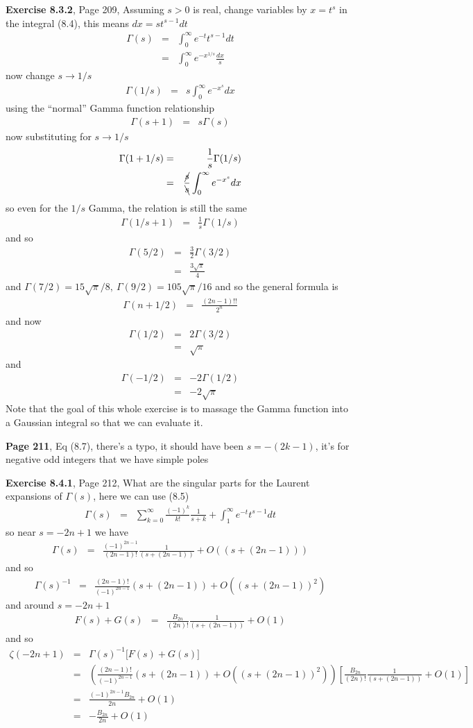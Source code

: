 \documentclass[aps,preprint,preprintnumbers,nofootinbib,showpacs,prd]{revtex4-1}
\newcommand{\nbea}{\begin{eqnarray*}}
\newcommand{\neea}{\end{eqnarray*}}
\begin{document}
{\bf Exercise 8.3.2}, Page 209, Assuming $s>0$ is real, change variables by $x=t^s$ in the integral (8.4), this means $dx=st^{s-1}dt$
%
\nbea
\Gamma(s) & = & \int_0^\infty e^{-t}t^{s-1}dt \\
& = & \int_0^\infty e^{-x^{1/s}} \frac{dx}{s}
\neea
%
now change $s\to 1/s$
%
\nbea
\Gamma(1/s) & = & s \int_0^\infty e^{-x^s} dx
\neea
%
using the ``normal'' Gamma function relationship
%
\nbea
\Gamma(s+1) & = & s\Gamma(s)
\neea
%
now substituting for $s\to1/s$
%
\nbea
\Gamma(1+1/s) & = & \frac{1}{s}\Gamma(1/s) \\
& = & \frac{\cancel{s}}{\bcancel{s}} \int_0^\infty e^{-x^s} dx
\neea
%
so even for the $1/s$ Gamma, the relation is still the same
%
\nbea
\Gamma(1/s+1) & = & \frac{1}{s}\Gamma(1/s)
\neea
%
and so
%
\nbea
\Gamma(5/2) & = & \frac{3}{2} \Gamma(3/2) \\
& = & \frac{3\sqrt{\pi}}{4}
\neea
%
and $\Gamma(7/2) = 15\sqrt{\pi}/8,~\Gamma(9/2) = 105\sqrt{\pi}/16$ and so the general formula is
%
\nbea
\Gamma(n+1/2) & = & \frac{(2n-1)!!}{2^n}
\neea
%
and now
%
\nbea
\Gamma(1/2) & = & 2 \Gamma(3/2) \\
& = & \sqrt{\pi}
\neea
%
and
%
\nbea
\Gamma(-1/2) & = & -2 \Gamma(1/2) \\
& = & -2\sqrt{\pi}
\neea
%
Note that the goal of this whole exercise is to massage the Gamma function into a Gaussian integral so that we can evaluate it.

{\bf Page 211}, Eq (8.7), there's a typo, it should have been $s=-(2k-1)$, it's for negative odd integers that we have simple poles

{\bf Exercise 8.4.1}, Page 212, What are the singular parts for the Laurent expansions of $\Gamma(s)$, here we can use (8.5)
%
\nbea
\Gamma(s) & = & \sum_{k=0}^\infty \frac{(-1)^k}{k!} \frac{1}{s+k} + \int_1^\infty e^{-t}t^{s-1}dt
\neea
%
so near $s=-2n+1$ we have
%
\nbea
\Gamma(s) & = & \frac{(-1)^{2n-1}}{(2n-1)!} \frac{1}{(s+(2n-1))} + O((s+(2n-1)))
\neea
%
and so
%
\nbea
\Gamma(s)^{-1} & = & \frac{(2n-1)!}{(-1)^{2n-1}} (s+(2n-1)) + O((s+(2n-1))^2)
\neea
%
and around $s=-2n+1$
%
\nbea
F(s) + G(s) & = & \frac{B_{2n}}{(2n)!}\frac{1}{(s + (2n-1))} + O(1)
\neea
%
and so
%
\nbea
\zeta(-2n+1) & = & \Gamma(s)^{-1} \lbrack F(s) + G(s)\rbrack\\
& = & \left(\frac{(2n-1)!}{(-1)^{2n-1}} (s+(2n-1)) + O((s+(2n-1))^2)\right) \left\lbrack  \frac{B_{2n}}{(2n)!}\frac{1}{(s + (2n-1))} + O(1) \right\rbrack \\
& = & \frac{(-1)^{2n-1}B_{2n}}{2n} + O(1) \\
& = & -\frac{B_{2n}}{2n} + O(1)
\neea
%
\end{document}
